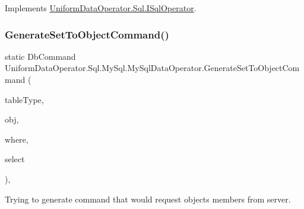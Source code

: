 Implements \mbox{\hyperlink{interface_uniform_data_operator_1_1_sql_1_1_i_sql_operator_a0757f304a24ffaa743e23e8bdd210950}{Uniform\+Data\+Operator.\+Sql.\+I\+Sql\+Operator}}.

\mbox{\label{class_uniform_data_operator_1_1_sql_1_1_my_sql_1_1_my_sql_data_operator_a0d3153822bac0ad760aed9f37e58d69b}} 
\subsubsection{\texorpdfstring{Generate\+Set\+To\+Object\+Command()}{GenerateSetToObjectCommand()}}
{\footnotesize\ttfamily static Db\+Command Uniform\+Data\+Operator.\+Sql.\+My\+Sql.\+My\+Sql\+Data\+Operator.\+Generate\+Set\+To\+Object\+Command (\begin{DoxyParamCaption}\item[{Type}]{table\+Type,  }\item[{object}]{obj,  }\item[{I\+Enumerable$<$ Member\+Info $>$}]{where,  }\item[{I\+Enumerable$<$ Member\+Info $>$}]{select }\end{DoxyParamCaption})\hspace{0.3cm}{\ttfamily [static]}, {\ttfamily [private]}}



Trying to generate command that would request objects members from server. 



